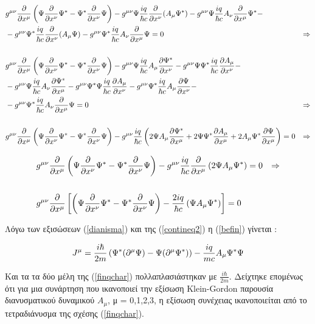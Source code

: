\begin{align*}
  \\
  \\ &g^{\mu\nu} \frac{\partial }{\partial x^\mu} \left(    \Psi\frac{\partial }{\partial x^\nu}\Psi^*  - \Psi^* \frac{\partial }{\partial x^\nu} \Psi \right)  - g^{\mu\nu} \Psi \frac{iq}{\hbar c}\frac{\partial }{\partial x^\nu}(A_\mu\Psi^*)-g^{\mu\nu}  \Psi \frac{iq}{\hbar c} A_\nu \frac{\partial }{\partial x^\mu} \Psi^*-
  \\& -g^{\mu\nu} \Psi^* \frac{iq}{\hbar c}\frac{\partial }{\partial x^\nu}(A_\mu \Psi) - g^{\mu\nu}  \Psi^*  \frac{iq}{\hbar c} A_\nu \frac{\partial }{\partial x^\mu} \Psi =0  &\Rightarrow 
  \\
  \\ &g^{\mu\nu} \frac{\partial }{\partial x^\mu} \left(    \Psi\frac{\partial }{\partial x^\nu}\Psi^*  - \Psi^* \frac{\partial }{\partial x^\nu} \Psi \right)  - g^{\mu\nu} \Psi \frac{iq}{\hbar c} A_\mu\frac{\partial \Psi^*}{\partial x^\nu}- g^{\mu\nu} \Psi \Psi^* \frac{iq}{\hbar c}\frac{\partial A_\mu}{\partial x^\nu}-
 \\&-g^{\mu\nu}\Psi \frac{iq}{\hbar c} A_\nu \frac{\partial \Psi^*}{\partial x^\mu} -g^{\mu\nu} \Psi^*  \Psi\frac{iq}{\hbar c}\frac{\partial A_\mu}{\partial x^\nu}-g^{\mu\nu} \Psi^* \frac{iq}{\hbar c}A_\mu\frac{\partial \Psi}{\partial x^\nu}- 
  \\&-g^{\mu\nu}  \Psi^*  \frac{iq}{\hbar c} A_\nu \frac{\partial }{\partial x^\mu} \Psi =0  &\Rightarrow
  \\
  \\ &g^{\mu\nu} \frac{\partial }{\partial x^\mu} \left(    \Psi\frac{\partial }{\partial x^\nu}\Psi^*  - \Psi^* \frac{\partial }{\partial x^\nu} \Psi \right)  - g^{\mu\nu} \frac{iq}{\hbar c} \left(  2\Psi A_\mu\frac{\partial \Psi^*}{\partial x^\mu} +2\Psi \Psi^* \frac{\partial A_\mu}{\partial x^\mu}+ 2 A_\mu \Psi^* \frac{\partial \Psi}{\partial x^\mu} \right) =0 &\Rightarrow
\end{align*}

\begin{align}
  \notag &g^{\mu\nu} \frac{\partial }{\partial x^\mu} \left(    \Psi\frac{\partial }{\partial x^\nu}\Psi^*  - \Psi^* \frac{\partial }{\partial x^\nu} \Psi \right)  - g^{\mu\nu} \frac{iq}{\hbar c} \frac{\partial }{\partial x^\mu}\left(  2\Psi A_\mu \Psi^* \right) =0 &\Rightarrow
  \notag\\
  \\& g^{\mu\nu} \frac{\partial }{\partial x^\mu} \left[   \left(  \Psi\frac{\partial }{\partial x^\nu}\Psi^*  - \Psi^* \frac{\partial }{\partial x^\nu} \Psi \right)  - \frac{2iq}{\hbar c} \left(  \Psi A_\mu \Psi^* \right)  \right]  = 0
  \label{befin}
\end{align}
\vspace{0.5cm}

Λόγω των εξισώσεων (\ref{dianisma}) και της (\ref{contineq2}) η (\ref{befin}) γίνεται : 
\vspace{0.5cm}
\begin{mdframed}
  \begin{equation}
    J^\mu =\frac{i \hbar}{2m} \left(  \Psi^* (\partial ^\mu \Psi)-\Psi(\partial ^\mu \Psi^*) \right)  - \frac{iq}{mc} A_\mu \Psi^* \Psi 
    \label{finqchar}
  \end{equation}
\end{mdframed}
\vspace{0.5cm}
Kαι τα τα δύο μέλη της (\ref{finqchar}) πολλαπλασιάστηκαν με $\frac{i \hbar}{2m}$. Δείχτηκε επομένως ότι για μια συνάρτηση που ικανοποιεί την εξίσωση \textlatin{Klein-Gordon} παρουσία διανυσματικού δυναμικού $A_\mu$, μ = 0,1,2,3, η εξίσωση συνέχειας ικανοποιείται από το τετραδιάνυσμα της σχέσης (\ref{finqchar}). 


